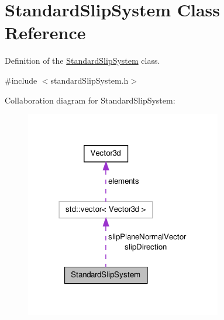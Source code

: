 \hypertarget{classStandardSlipSystem}{\section{\-Standard\-Slip\-System \-Class \-Reference}
\label{d1/dd4/classStandardSlipSystem}
}


\-Definition of the \hyperlink{classStandardSlipSystem}{\-Standard\-Slip\-System} class.  




{\ttfamily \#include $<$standard\-Slip\-System.\-h$>$}



\-Collaboration diagram for \-Standard\-Slip\-System\-:\nopagebreak
\begin{figure}[H]
\begin{center}
\leavevmode
\includegraphics[width=243pt]{dd/dc7/classStandardSlipSystem__coll__graph}
\end{center}
\end{figure}
